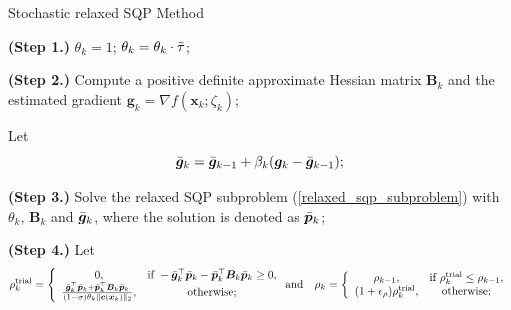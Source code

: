 \documentclass[aos]{imsart}
\numberwithin{equation}{section}
\theoremstyle{plain}
\begin{document}
\begin{algorithm}[htb]
 \caption{Stochastic relaxed SQP Method}
 \label{alg_stoch_relaxed_sqp_averaging_grad}
 \begin{algorithmic}[1]
 \renewcommand{\algorithmicrequire}{\textbf{Input:} $\bm{\ell} \leq \bm{x}_0 \leq \bm{u}$, $\tau, \Tilde{\tau} \in (0,1)$, $\sigma \in (0,1)$, $\rho_{-1} >0$, $\epsilon_{\rho}, \epsilon_{\xi}, \beta \in (0,1)$, $\mu \in (0,1)$, $\varrho>0$, $\{\beta_k\}_{k=0}^{\infty}$, $\{\gamma_k\}_{k=0}^{\infty}$.}
 \REQUIRE 
  \STATE \textbf{(Step 1.)} $\theta_k = 1$;
  \STATE $\theta_k = \theta_k \cdot \Tilde{\tau}$;

  \ENDWHILE

  \STATE \textbf{(Step 2.)} Compute a positive definite approximate Hessian matrix $\bm{B}_k$ and the estimated gradient $\bm{g}_k = \nabla f(\bm{x}_k; \zeta_{k})$;

  \STATE Let 
  \begin{equation*}
      \Bar{\bm{g}}_k = \Bar{\bm{g}}_{k-1} + \beta_k (\bm{g}_k - \Bar{\bm{g}}_{k-1});
  \end{equation*}
  
  \STATE \textbf{(Step 3.)} Solve the relaxed SQP subproblem (\ref{relaxed_sqp_subproblem}) with $\theta_k$, $\bm{B}_k$ and $\Bar{\bm{g}}_{k}$, where the solution is denoted as $\Bar{\bm{p}}_k$;

  \STATE \textbf{(Step 4.)} Let \begin{equation}
  \label{stoch_rho_trial}
        \rho_k^{\text{trial}} = \left \{ \begin{array}{cc}
           0,  & \text{if}~ -\Bar{\bm{g}}_k^{\top} \Bar{\bm{p}}_k - \Bar{\bm{p}}_k^{\top} \bm{B}_k \Bar{\bm{p}}_k \geq 0, \\
           \frac{\Bar{\bm{g}}_k^{\top} \Bar{\bm{p}}_k + \Bar{\bm{p}}_k^{\top} \bm{B}_k \Bar{\bm{p}}_k}{(1-\sigma)\theta_k \|\bm{c}(\bm{x}_k)\|_2},  &  \text{otherwise;}
        \end{array}\right. \text{and} \quad 
        \rho_k = \left\{ \begin{array}{cc}
        \rho_{k-1}, &  \text{if}~\rho_{k}^{\text{trial}} \leq \rho_{k-1}, \\
        (1+\epsilon_{\rho})\rho_{k}^{\text{trial}}, & \text{otherwise};
    \end{array} \right.
    \end{equation}
  

\end{algorithmic}
\end{algorithm}
\end{document}
